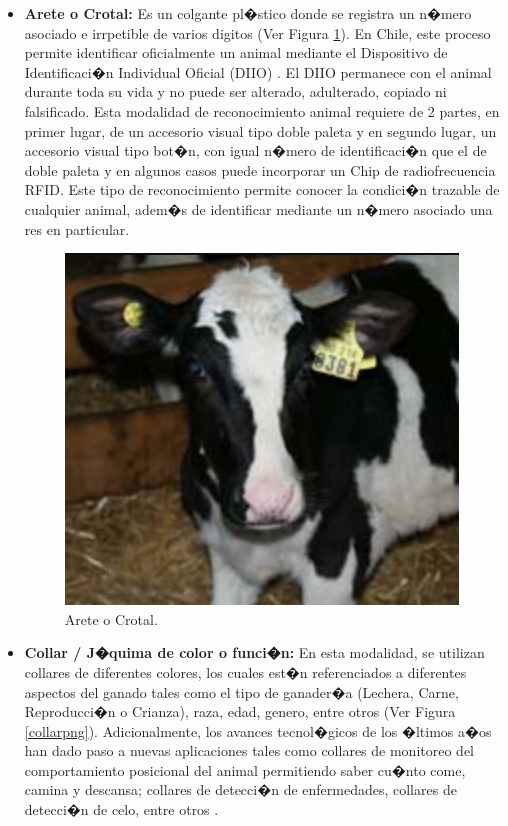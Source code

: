 \begin{itemize}
\begin{itemize}
		\item \textbf{Arete o Crotal:} Es un colgante pl�stico donde se registra un n�mero asociado e irrpetible de varios digitos (Ver Figura \ref{aretepng}). En Chile, este proceso permite identificar oficialmente un animal mediante el Dispositivo de Identificaci�n Individual Oficial (DIIO) \cite{diio}. El DIIO permanece con el animal durante toda su vida y no puede ser alterado, adulterado, copiado ni falsificado. Esta modalidad de reconocimiento animal requiere de 2 partes, en primer lugar, de un accesorio visual tipo doble paleta y en segundo lugar, un accesorio visual tipo bot�n, con igual n�mero de identificaci�n que el de doble paleta y en algunos casos puede incorporar un Chip de radiofrecuencia RFID. Este tipo de reconocimiento permite conocer la condici�n trazable de cualquier animal, adem�s de identificar mediante un n�mero asociado una res en particular.
		
		\begin{figure}[H]
		\begin{center}
			\includegraphics[scale=0.7]{img/arete.png}
		\end{center}
		\caption{Arete o Crotal. \label{aretepng}}
		\end{figure}
		
		\item \textbf{Collar / J�quima de color o funci�n:} En esta modalidad, se utilizan collares de diferentes colores, los cuales est�n referenciados a diferentes aspectos del ganado tales como el tipo de ganader�a (Lechera, Carne, Reproducci�n o Crianza), raza, edad, genero, entre otros (Ver Figura \ref{collarpng}). Adicionalmente, los avances tecnol�gicos de los �ltimos a�os han dado paso a nuevas aplicaciones tales como collares de monitoreo del comportamiento posicional del animal permitiendo saber cu�nto come, camina y descansa; collares de detecci�n de enfermedades, collares de detecci�n de celo, entre otros \cite{collares}. 
		

\end{itemize}
\end{itemize}
